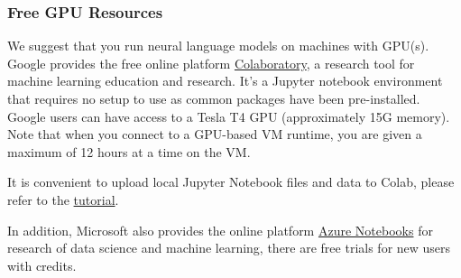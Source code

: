 \documentclass[11pt]{article}
\begin{document}
    \hypertarget{free-gpu-resources}{%
\subsubsection{Free GPU Resources}\label{free-gpu-resources}}

We suggest that you run neural language models on machines with GPU(s).
Google provides the free online platform
\href{https://colab.research.google.com/notebooks/welcome.ipynb}{Colaboratory},
a research tool for machine learning education and research. It's a
Jupyter notebook environment that requires no setup to use as common
packages have been pre-installed. Google users can have access to a
Tesla T4 GPU (approximately 15G memory). Note that when you connect to a
GPU-based VM runtime, you are given a maximum of 12 hours at a time on
the VM.

It is convenient to upload local Jupyter Notebook files and data to
Colab, please refer to the
\href{https://colab.research.google.com/notebooks/io.ipynb}{tutorial}.

In addition, Microsoft also provides the online platform
\href{https://notebooks.azure.com/help/introduction}{Azure Notebooks}
for research of data science and machine learning, there are free trials
for new users with credits.


    
    
    
    
\end{document}
